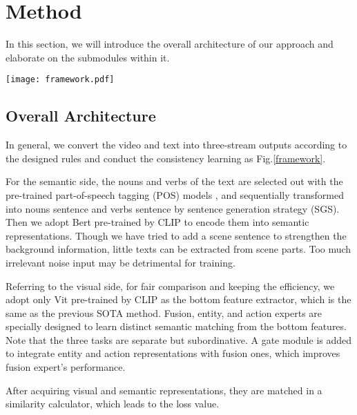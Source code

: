 \documentclass[letterpaper]{article} \usepackage{aaai22}  \usepackage{times}  \usepackage{helvet}  \usepackage{courier}  \usepackage[hyphens]{url}  \usepackage{graphicx} \urlstyle{rm} \def\UrlFont{\rm}  \usepackage{natbib}  \usepackage{caption}
\begin{document}
\section{Method}
In this section, we will introduce the overall architecture of our approach and elaborate on the submodules within it.

\begin{figure*}[h]
\begin{center}
\texttt{[image: framework.pdf]}
\end{center}
\caption{An overview of the proposed CAMoE. SGS denotes the sentence generation strategy, which is explained in Fig.\ref{sgs_and_vfas}}
\label{framework}
\end{figure*}

\subsection{Overall Architecture}
In general, we convert the video and text into three-stream outputs according to the designed rules and conduct the consistency learning as Fig.\ref{framework}.

For the semantic side, the nouns and verbs of the text are selected out with the pre-trained part-of-speech tagging (POS) models \cite{toutanova2003feature,ratnaparkhi1996maximum}, and sequentially transformed into nouns sentence and verbs sentence by sentence generation strategy (SGS). Then we adopt Bert \cite{devlin2018Bert} pre-trained by CLIP \cite{radford2021learning} to encode 
them into semantic representations. Though we have tried to add a scene sentence to strengthen the background information, little texts can be extracted from scene parts. Too much irrelevant noise input may be detrimental for training.

Referring to the visual side, for fair comparison and keeping the efficiency, we adopt only Vit \cite{dosovitskiy2020image} pre-trained by CLIP \cite{radford2021learning} as the bottom feature extractor, which is the same as the previous SOTA method. Fusion, entity, and action experts are specially designed to learn distinct semantic matching from the bottom features. Note that the three tasks are separate but subordinative. A gate module \cite{ma2018modeling} is added to integrate entity and action representations with fusion ones, which improves fusion expert's performance.

After acquiring visual and semantic representations, they are matched in a similarity calculator, which leads to the loss value.
\end{document}
